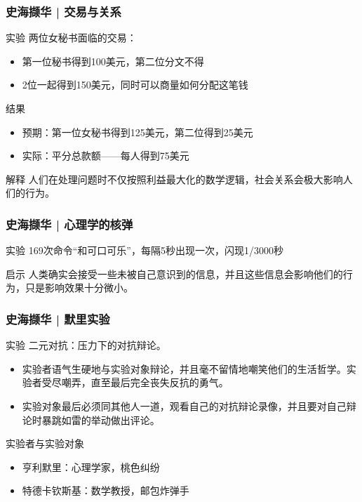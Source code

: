 \begin{frame}
  \frametitle{史海撷华 | 交易与关系}
  \begin{block}{实验}
    两位女秘书面临的交易：
    \begin{itemize}
      \item 第一位秘书得到100美元，第二位分文不得
      \item 2位一起得到150美元，同时可以商量如何分配这笔钱
    \end{itemize}
  \end{block}
  \pause
  \begin{block}{结果}
    \begin{itemize}
      \item 预期：第一位女秘书得到125美元，第二位得到25美元
      \item 实际：平分总款额——每人得到75美元
    \end{itemize}
  \end{block}
  \pause
  \begin{block}{解释}
    人们在处理问题时不仅按照利益最大化的数学逻辑，社会关系会极大影响人们的行为。
  \end{block}
\end{frame}

\begin{frame}
  \frametitle{史海撷华 | 心理学的核弹}
  \begin{block}{实验}
    169次命令“和可口可乐”，每隔5秒出现一次，闪现1/3000秒
  \end{block}
  \pause
  \begin{block}{启示}
    人类确实会接受一些未被自己意识到的信息，并且这些信息会影响他们的行为，只是影响效果十分微小。
  \end{block}
\end{frame}

\begin{frame}
  \frametitle{史海撷华 | 默里实验}
  \begin{block}{实验}
    二元对抗：压力下的对抗辩论。
    \begin{itemize}
      \item 实验者语气生硬地与实验对象辩论，并且毫不留情地嘲笑他们的生活哲学。实验者受尽嘲弄，直至最后完全丧失反抗的勇气。
      \item 实验对象最后必须同其他人一道，观看自己的对抗辩论录像，并且要对自己辩论时暴跳如雷的举动做出评论。
    \end{itemize}
  \end{block}
  \pause
  \begin{block}{实验者与实验对象}
    \begin{itemize}
      \item 亨利\textbullet 默里：心理学家，桃色纠纷
      \item 特德\textbullet 卡钦斯基：数学教授，邮包炸弹手
    \end{itemize}
  \end{block}
\end{frame}

